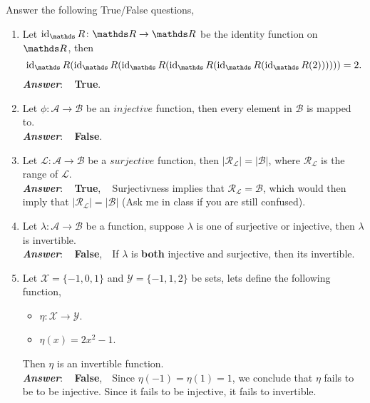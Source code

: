 \documentclass[12pt]{article} %
\begin{document}
\begin{qstn}[1][(8 points)] %
  Answer the following True/False questions,
  \begin{enumerate}
    \item Let $\operatorname{id}_\R \colon \R \to \R$ be the identity function on $\R$, then
       \[
              \operatorname{id}_\R\left(\operatorname{id}_\R\left(\operatorname{id}_\R\left(\operatorname{id}_\R\left(\operatorname{id}_\R\left(\operatorname{id}_\R\left(2
              \right) \right) \right) \right) \right) \right) = 2
      .\] 
      \textbf{\emph{Answer}}: \,\,\, \textbf{True}.\\

    \item Let $\phi \colon \mathcal{A} \to \mathcal{B}$ be an $\textit{injective}$ function, then every element in
      $\mathcal{B}$ is mapped to.\\
      \textbf{\emph{Answer}}: \,\,\, \textbf{False}.\\

    \item Let $\mathcal{L} \colon \mathcal{A} \to \mathcal{B}$ be a $\textit{surjective}$ function, then
          $\left|\mathcal{R_\mathcal{L}}\right| = \left|\mathcal{B}\right|$, where $\mathcal{R_\mathcal{L}}$ is the
          range of $\mathcal{L}$.\\
      \textbf{\emph{Answer}}: \,\,\, \textbf{True}, \,\,\, Surjectivness implies that $\mathcal{R_\mathcal{L}} =
      \mathcal{B}$, which would then imply that $\left|\mathcal{R_\mathcal{L}}\right| = \left|\mathcal{B}\right|$
      (Ask me in class if you are still confused).\\

    \item Let $\lambda \colon \mathcal{A} \to \mathcal{B}$ be a function, suppose $\lambda$ is one of surjective or
      injective, then $\lambda$ is invertible.\\
      \textbf{\emph{Answer}}: \,\,\, \textbf{False}, \,\, If $\lambda$ is \textbf{both} injective and surjective,
      then its invertible.\\

    \item Let $ \mathcal{X} = \{-1,0,1\} $ and $ \mathcal{Y} = \{-1,1,2\} $ be sets, lets define the
            following function, 
            \begin{itemize}
              \item $\mathcal{\eta} \colon \mathcal{X} \to \mathcal{Y}$.
              \item $\mathcal{\eta}(x) = 2x^2 - 1$.
            \end{itemize}
            Then $\eta$ is an invertible function.\\
      \textbf{\emph{Answer}}: \,\,\, \textbf{False}, \,\, Since $\eta (-1) = \eta(1) = 1$, we conclude that
      $\eta$ fails to be to be injective. Since it fails to be injective, it fails to invertible.\\


\end{enumerate}
\end{qstn}
\end{document}
